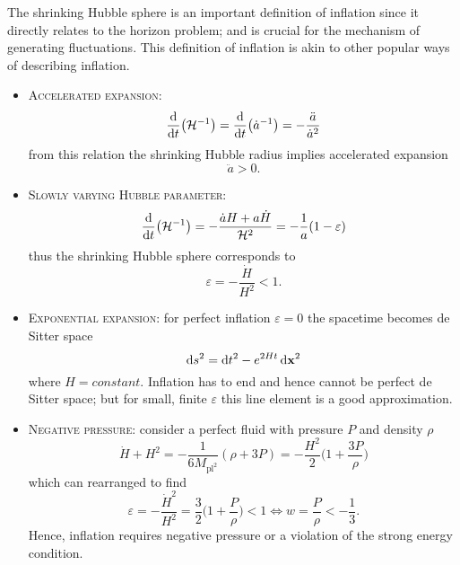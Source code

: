 The shrinking Hubble sphere is an important definition of inflation since it directly relates to the horizon problem; and is crucial for the mechanism of generating fluctuations.
This definition of inflation is akin to other popular ways of describing inflation.
%
\begin{itemize}
	\item \textsc{Accelerated expansion}:
	      \begin{equation}
		      \dv{t} \big(\mathcal{H}^{-1}\big)
		      = \dv{t} \big(\dot{a}^{-1}\big)
		      = -\frac{\ddot{a}}{\dot{a}^{2}}
	      \end{equation}
	      from this relation the shrinking Hubble radius implies accelerated expansion
	      \begin{equation}
		      \ddot{a}
		      > 0.
	      \end{equation}

	\item \textsc{Slowly varying Hubble parameter}:
	      \begin{equation}
		      \dv{t} \big(\mathcal{H}^{-1}\big)
		      = -\frac{\dot{a}H + a\dot{H}}{\mathcal{H}^{2}}
		      = -\frac{1}{a}(1-\varepsilon)
	      \end{equation}
	      thus the shrinking Hubble sphere corresponds to
	      \begin{equation}
		      \varepsilon
		      = -\frac{\dot{H}}{H^{2}}
		      < 1.
	      \end{equation}

	\item \textsc{Exponential expansion}:
	      for perfect inflation \(\varepsilon=0\) the spacetime becomes de Sitter space
	      \begin{equation}
		      \dd{s^{2}}
		      = \dd{t^{2}} - e^{2Ht} \dd{\vb{x}^{2}}
	      \end{equation}
	      where \(H=constant\).
	      Inflation has to end and hence cannot be perfect de Sitter space; but for small, finite \({\varepsilon}\) this line element is a good approximation.

	\item \textsc{Negative pressure}:
	      consider a perfect fluid with pressure \(P\) and density \({\rho}\)
	      \begin{equation}\label{eq:negative_pressure}
		      \dot{H} + H^{2}
		      = -\frac{1}{6M_{\text{pl}^{2}}}(\rho+3P)
		      = -\frac{H^{2}}{2} \bigg(1 + \frac{3P}{\rho}\bigg)
	      \end{equation}
	      which can rearranged to find
	      \begin{equation}
		      \varepsilon
		      = -\frac{\dot{H}^{2}}{H^{2}}
		      = \frac{3}{2} \bigg(1 + \frac{P}{\rho}\bigg) < 1 \Leftrightarrow w = \frac{P}{\rho} < -\frac{1}{3}.
	      \end{equation}
	      Hence, inflation requires negative pressure or a violation of the strong energy condition.


\end{itemize}
